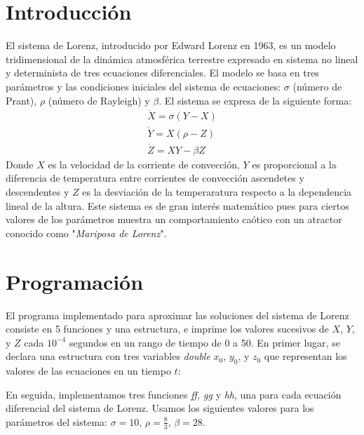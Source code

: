 \documentclass[letterpaper, 12pt]{article}
\begin{document}
{\section*{Introducci\'on}

\justify
El sistema de Lorenz, introducido por Edward Lorenz en 1963, es un modelo tridimensional de la dinámica atmosférica terrestre expresado en sistema no lineal y determinista de tres ecuaciones diferenciales. El modelo se basa en tres parámetros y las condiciones iniciales del sistema de ecuaciones: $\sigma$ (número de Prant), $\rho$ (número de Rayleigh) y $\beta$.
El sistema se expresa de la siguiente forma:
\begin{align}
\dot{X} = \sigma (Y-X)\\
\dot{Y} = X(\rho - Z)\\
\dot{Z} = XY - \beta Z
\end{align}
Donde $X$ es la velocidad de la corriente de convección, $Y$ es proporcional a la diferencia de temperatura entre  corrientes de convección ascendetes y descendentes y $Z$ es la desviación de la temperaratura respecto a la dependencia lineal de la altura. Este sistema es de gran interés matemático pues para ciertos valores de los parámetros muestra un comportamiento caótico con un atractor conocido como "\textit{Mariposa de Lorenz}". 


\section*{Programaci\'on}

\justify
El programa implementado para aproximar las soluciones del sistema de Lorenz consiste en 5 funciones y una estructura, e imprime los valores sucesivos de $X$, $Y$, y $Z$ cada $10^{-4}$ segundos en un rango de tiempo de 0 a 50. En primer lugar, se declara una estructura con tres variables \textit{double} $x_0$, $y_0$, y $z_0$ que representan los valores de las ecuaciones en un tiempo $t$:\\
\begin{center}
\end{center}
 En seguida, implementamos tres funciones \textit{ff, gg} y \textit{hh}, una para cada ecuación diferencial del sistema de Lorenz. Usamos los siguientes valores para los parámetros del sistema: $\sigma = 10$, $\rho = \frac{8}{3}$, $\beta = 28$. 
\begin{center}
\end{center}

}
\end{document}
